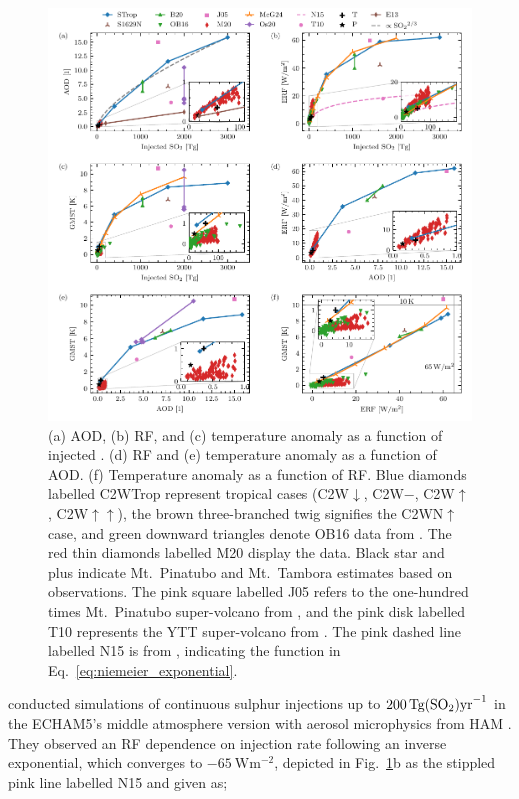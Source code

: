 \documentclass[draft]{agujournal2019}
\begin{document}
  \begin{figure}
    \centering \includegraphics[width=\textwidth]{figure4}

    \caption{(a) AOD, (b) RF, and (c) temperature anomaly as a function of injected
      \@. (d) RF and (e) temperature anomaly as a function of AOD. (f)
      Temperature anomaly as a function of RF. Blue diamonds labelled C2WTrop represent
      tropical cases (C2W\(\downarrow\), C2W\(-\), C2W\(\uparrow\),
      C2W\(\uparrow\uparrow\)), the brown three-branched twig signifies the
      C2WN\(\uparrow\) case, and green downward triangles denote OB16 data from
      . The red thin diamonds labelled M20 display the
       data. Black star and plus indicate Mt.\ Pinatubo and
      Mt.\ Tambora estimates based on observations. The pink square labelled J05 refers
      to the one-hundred times Mt.\ Pinatubo super-volcano from , and
      the pink disk labelled T10 represents the YTT super-volcano from
      . The pink dashed line labelled N15 is from
      , indicating the function in
      Eq.~\ref{eq:niemeier_exponential}.}\label{fig:4_parameter_scan}%
  \end{figure}

   conducted simulations of continuous sulphur injections up to
  \(\SI{200}{\tera\gram(\ce{SO2})\mathrm{yr}^{-1}}\) in the ECHAM5's middle atmosphere
  version \cite{giorgetta2006} with aerosol microphysics from HAM \cite{stier2005}. They
  observed an RF dependence on  injection rate following an inverse exponential,
  which converges to \(\SI{-65}{\watt\meter^{-2}}\), depicted in
  Fig.~\ref{fig:4_parameter_scan}b as the stippled pink line labelled N15 and given as;
\end{document}
